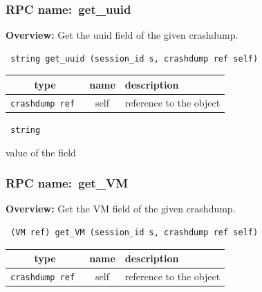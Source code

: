 \subsubsection{RPC name:~get\_uuid}

{\bf Overview:} 
Get the uuid field of the given crashdump.

\begin{verbatim} string get_uuid (session_id s, crashdump ref self)\end{verbatim}



 
\vspace{0.3cm}
\begin{tabular}{|c|c|p{7cm}|}
 \hline
{\bf type} & {\bf name} & {\bf description} \\ \hline
{\tt crashdump ref } & self & reference to the object \\ \hline 

\end{tabular}

\vspace{0.3cm}

{\tt 
string
}


value of the field
\vspace{0.3cm}
\vspace{0.3cm}
\vspace{0.3cm}
\subsubsection{RPC name:~get\_VM}

{\bf Overview:} 
Get the VM field of the given crashdump.

\begin{verbatim} (VM ref) get_VM (session_id s, crashdump ref self)\end{verbatim}



 
\vspace{0.3cm}
\begin{tabular}{|c|c|p{7cm}|}
 \hline
{\bf type} & {\bf name} & {\bf description} \\ \hline
{\tt crashdump ref } & self & reference to the object \\ \hline 

\end{tabular}

\vspace{0.3cm}

